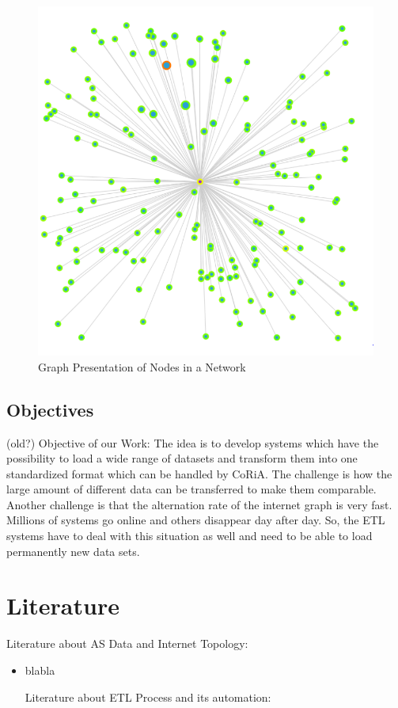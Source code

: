 \documentclass[conference]{IEEEtran}
\begin{document}
\begin{figure}[htbp]
\centerline{\includegraphics[scale=0.2]{Graphics/nodePresentaion.PNG}}
\caption{Graph Presentation of Nodes in a Network}
\label{fig}
\end{figure}


\subsection{Objectives}
(old?)
Objective of our Work:
The idea is to develop systems which have the possibility to load a wide range of datasets and transform them into one standardized format which can be handled by CoRiA.
The challenge is how the large amount of different data can be transferred to make them comparable.
Another challenge is that the alternation rate of the internet graph is very fast. Millions of systems go online and others disappear day after day. So, the ETL systems have to deal with this situation as well and need to be able to load permanently new data sets.

\section{Literature}

Literature about AS Data and Internet Topology: \\
\begin{itemize}


\item blabla

Literature about ETL Process and its automation: \\

\end{itemize}
\end{document}
